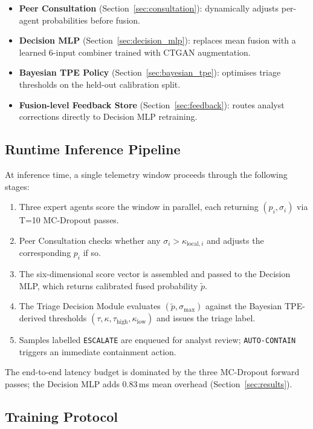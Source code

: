 \documentclass[journal]{IEEEtran}
\newcommand{\tauh}{\tau_{\mathrm{high}}}
\newcommand{\klow}{\kappa_{\mathrm{low}}}
\newcommand{\pfused}{\tilde{p}}
\begin{document}
\begin{itemize}
  \item \textbf{Peer Consultation} (Section~\ref{sec:consultation}):
    dynamically adjusts per-agent probabilities before fusion.
  \item \textbf{Decision MLP} (Section~\ref{sec:decision_mlp}):
    replaces mean fusion with a learned 6-input combiner trained
    with CTGAN augmentation.
  \item \textbf{Bayesian TPE Policy} (Section~\ref{sec:bayesian_tpe}):
    optimises triage thresholds on the held-out calibration split.
  \item \textbf{Fusion-level Feedback Store} (Section~\ref{sec:feedback}):
    routes analyst corrections directly to Decision MLP retraining.
\end{itemize}

\subsection{Runtime Inference Pipeline}

At inference time, a single telemetry window proceeds through the
following stages:
\begin{enumerate}
  \item Three expert agents score the window in parallel, each returning
        $(p_i, \sigma_i)$ via T=10 MC-Dropout passes.
  \item Peer Consultation checks whether any $\sigma_i > \kappa_{\mathrm{local},i}$
        and adjusts the corresponding $p_i$ if so.
  \item The six-dimensional score vector is assembled and passed to the
        Decision MLP, which returns calibrated fused probability $\pfused$.
  \item The Triage Decision Module evaluates $(\pfused, \sigma_{\max})$
        against the Bayesian TPE-derived thresholds
        $(\tau, \kappa, \tauh, \klow)$ and issues the triage label.
  \item Samples labelled \texttt{ESCALATE} are enqueued for analyst review;
        \texttt{AUTO-CONTAIN} triggers an immediate containment action.
\end{enumerate}
The end-to-end latency budget is dominated by the three MC-Dropout forward
passes; the Decision MLP adds 0.83\,ms mean overhead
(Section~\ref{sec:results}).

\subsection{Training Protocol}
\end{document}
